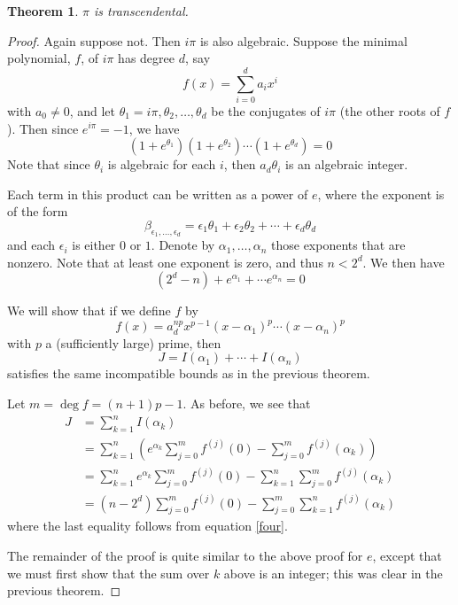 \documentclass[12pt]{article}
\newcommand{\fdiff}[2]{f^{(#1)}(#2)}
\newtheorem{thm}{Theorem}
\begin{document}
\begin{thm} \label{thm:two}$\pi$ is transcendental.
\end{thm}
\begin{proof}
Again suppose not. Then $i\pi$ is also algebraic. Suppose the minimal polynomial, $f$, of $i\pi$ has degree $d$, say
\[f(x)=\sum_{i=0}^d a_i x^i\]
with $a_0\neq 0$, and let $\theta_1=i\pi, \theta_2,\ldots,\theta_d$ be the conjugates of $i\pi$ (the other roots of $f$). Then since $e^{i\pi}=-1$, we have
\[(1+e^{\theta_1})(1+e^{\theta_2})\cdots(1+e^{\theta_d})=0\]
Note that since $\theta_i$ is algebraic for each $i$, then $a_d\theta_i$ is an algebraic integer.

Each term in this product can be written as a power of $e$, where the exponent is of the form
\[\beta_{\epsilon_1,\ldots,\epsilon_d}=\epsilon_1\theta_1+\epsilon_2\theta_2+\cdots+\epsilon_d\theta_d\]
and each $\epsilon_i$ is either $0$ or $1$. Denote by $\alpha_1,\ldots,\alpha_n$ those exponents that are nonzero. Note that at least one exponent is zero, and thus $n<2^d$. We then have
\begin{equation}\label{four}(2^d-n)+e^{\alpha_1}+\cdots e^{\alpha_n} = 0\end{equation}

We will show that if we define $f$ by
\[f(x)=a_d^{np}x^{p-1}(x-\alpha_1)^p\cdots(x-\alpha_n)^p\]
with $p$ a (sufficiently large) prime, then
\[J=I(\alpha_1)+\cdots+I(\alpha_n)\]
satisfies the same incompatible bounds as in the previous theorem.

Let $m=\deg f=(n+1)p-1$. As before, we see that 
\begin{align*}J&=\sum_{k=1}^n I(\alpha_k)\\
&= \sum_{k=1}^n \left(e^{\alpha_k}\sum_{j=0}^m \fdiff j0 - \sum_{j=0}^m \fdiff j{\alpha_k}\right)\\
&=\sum_{k=1}^n e^{\alpha_k} \sum_{j=0}^m \fdiff j0 - \sum_{k=1}^n \sum_{j=0}^m \fdiff j{\alpha_k}\\
&=(n-2^d)\sum_{j=0}^m \fdiff j0-\sum_{j=0}^m \sum_{k=1}^n \fdiff j{\alpha_k}
\end{align*}
where the last equality follows from equation \eqref{four}.

The remainder of the proof is quite similar to the above proof for $e$, except that we must first show that the sum over $k$ above is an integer; this was clear in the previous theorem.


\end{proof}
\end{document}
